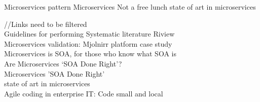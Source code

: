 Microservices pattern \cite{Richardson:2014ac}
Microservices Not a free lunch \cite{Wootton:2014aa}
state of art in microservices \cite{Cockcroft:2015aa}


//Links need to be filtered
\\
Guidelines for performing Systematic literature Riview \cite{np:2007aa}
\\
Microservices validation: Mjolnirr platform case study \cite{Radchenko:2015aa}
\\
Microservices is SOA, for those who know what SOA is \cite{Jones:2014aa}
\\
Are Microservices ‘SOA Done Right’? \cite{Bloomberg:2015aa}
\\
Microservices 'SOA Done Right'\cite{Romanski:2015aa}
\\
state of art in microservices \cite{Cockcroft:2015aa}
\\
Agile coding in enterprise IT: Code small and local\cite{Curran:2014aa}